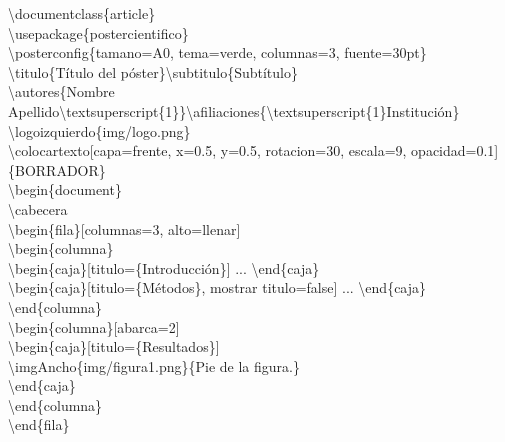 \documentclass{article}
\newcommand{\bs}{\textbackslash}
\begin{document}
\begin{fila}[columnas=5]
  \begin{columna}[abarca=3]
    \begin{caja}[titulo={Ejemplo mínimo de un póster}, estilo=borde]
      \begin{codigoej}
        \bs documentclass\{article\}\\
        \bs usepackage\{postercientifico\}\\
        \bs posterconfig\{tamano=A0, tema=verde, columnas=3, fuente=30pt\}\\
        \bs titulo\{Título del póster\}\quad\bs subtitulo\{Subtítulo\}\\
        \bs autores\{Nombre Apellido\bs textsuperscript\{1\}\}\quad\bs afiliaciones\{\bs textsuperscript\{1\}Institución\}\\
        \bs logoizquierdo\{img/logo.png\}\\
        \bs colocartexto[capa=frente, x=0.5, y=0.5, rotacion=30, escala=9, opacidad=0.1]\{BORRADOR\}\\
        \bs begin\{document\}\\
        \bs cabecera\\
        \bs begin\{fila\}[columnas=3, alto=llenar]\\
        \hspace*{1em}\bs begin\{columna\}\\
        \hspace*{2em}\bs begin\{caja\}[titulo=\{Introducción\}] ... \bs end\{caja\}\\
        \hspace*{2em}\bs begin\{caja\}[titulo=\{Métodos\}, mostrar titulo=false] ... \bs end\{caja\}\\
        \hspace*{1em}\bs end\{columna\}\\
        \hspace*{1em}\bs begin\{columna\}[abarca=2]\\
        \hspace*{2em}\bs begin\{caja\}[titulo=\{Resultados\}]\\
        \hspace*{3em}\bs imgAncho\{img/figura1.png\}\{Pie de la figura.\}\\
        \hspace*{2em}\bs end\{caja\}\\
        \hspace*{1em}\bs end\{columna\}\\
        \bs end\{fila\}\\

\end{codigoej}
\end{caja}
\end{columna}
\end{fila}
\end{document}
